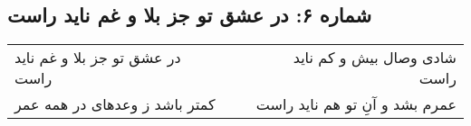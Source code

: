 \begin{center}
\section*{شماره ۶: در عشق تو جز بلا و غم ناید راست}
\label{sec:006}
\begin{longtable}{l p{0.5cm} r}
در عشق تو جز بلا و غم ناید راست
&&
شادی وصال بیش و کم ناید راست
\\
کمتر باشد ز وعدهای در همه عمر
&&
عمرم بشد و آنِ تو هم ناید راست
\\
\end{longtable}
\end{center}
